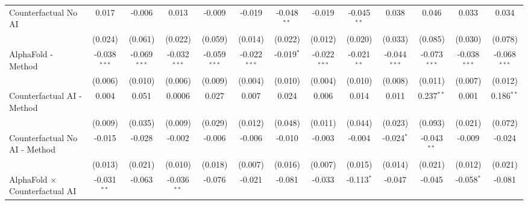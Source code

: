 \begin{tabular}{lcccccccccccc}
   Counterfactual No AI                                       & 0.017          & -0.006         & 0.013          & -0.009         & -0.019         & -0.048$^{**}$  & -0.019         & -0.045$^{**}$  & 0.038          & 0.046          & 0.033          & 0.034\\   
                                                              & (0.024)        & (0.061)        & (0.022)        & (0.059)        & (0.014)        & (0.022)        & (0.012)        & (0.020)        & (0.033)        & (0.085)        & (0.030)        & (0.078)\\   
   AlphaFold - Method                                         & -0.038$^{***}$ & -0.069$^{***}$ & -0.032$^{***}$ & -0.059$^{***}$ & -0.022$^{***}$ & -0.019$^{*}$   & -0.022$^{***}$ & -0.021$^{**}$  & -0.044$^{***}$ & -0.073$^{***}$ & -0.038$^{***}$ & -0.068$^{***}$\\   
                                                              & (0.006)        & (0.010)        & (0.006)        & (0.009)        & (0.004)        & (0.010)        & (0.004)        & (0.010)        & (0.008)        & (0.011)        & (0.007)        & (0.012)\\   
   Counterfactual AI - Method                                 & 0.004          & 0.051          & 0.0006         & 0.027          & 0.007          & 0.024          & 0.006          & 0.014          & 0.011          & 0.237$^{**}$   & 0.001          & 0.186$^{**}$\\   
                                                              & (0.009)        & (0.035)        & (0.009)        & (0.029)        & (0.012)        & (0.048)        & (0.011)        & (0.044)        & (0.023)        & (0.093)        & (0.021)        & (0.072)\\   
   Counterfactual No AI - Method                              & -0.015         & -0.028         & -0.002         & -0.006         & -0.006         & -0.010         & -0.003         & -0.004         & -0.024$^{*}$   & -0.043$^{**}$  & -0.009         & -0.024\\   
                                                              & (0.013)        & (0.021)        & (0.010)        & (0.018)        & (0.007)        & (0.016)        & (0.007)        & (0.015)        & (0.014)        & (0.021)        & (0.012)        & (0.021)\\   
   AlphaFold $\times$ Counterfactual AI                       & -0.031$^{**}$  & -0.063         & -0.036$^{**}$  & -0.076         & -0.021         & -0.081         & -0.033         & -0.113$^{*}$   & -0.047         & -0.045         & -0.058$^{*}$   & -0.081\\   

\end{tabular}

